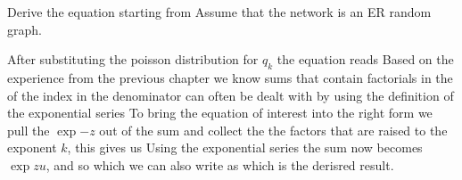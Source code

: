 
Derive the equation
starting from 
Assume that the network is an ER random graph. 

\solution

 After substituting the poisson distribution for $q_k$ the equation reads
Based on the experience from the previous chapter we know sums that contain factorials in the of the index in the denominator can often be dealt with by using the definition of the exponential series
To bring the equation of interest into the right form we pull the $\exp{-z}$ out of the sum and collect the the factors that are raised to the exponent $k$, this gives us 
Using the exponential series the sum now becomes $\exp{zu}$, and so
which we can also write as 
which is the derisred result.

